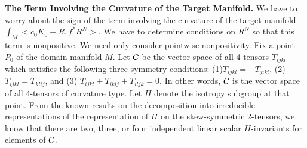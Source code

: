 \smallskip
\noindent
{\bf The Term Involving the Curvature of the Target Manifold.} We have to worry about the sign of the term involving the curvature of the target manifold $\int_{M} < c_{0}K_{0} + R, f^{*}R^{N}>$. We have to determine conditions on $R^{N}$ so that this term is nonpositive. We need only consider pointwise nonpositivity. Fix a point $P_{0}$ of the domain manifold $M$. Let $\mathcal{C}$ be  the vector space of all 4-tensors $T_{ijkl}$ which satisfies the following three symmetry conditions:
(1)$T_{ijkl}= -T_{jikl}$, (2) $T_{ijkl}= T_{klij}$, and (3) $T_{ijkl} + T_{iklj} + T_{iljk} =0$. In other words, $\mathcal{C}$ is the vector space of all 4-tensors of curvature type. Let $H$ denote the isotropy subgroup at that point. From the known results on the decomposition into irreducible representations of the representation of $H$ on the skew-symmetric 2-tensors, we know that there are two, three, or four independent linear scalar $H$-invariants for elements of $\mathcal{C}$.

